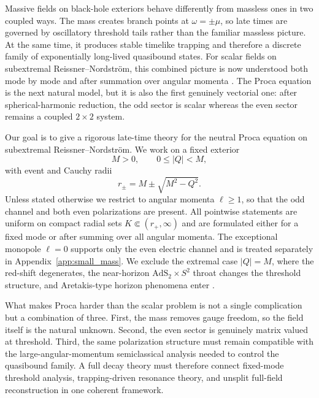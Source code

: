 \documentclass[12pt]{article}
\numberwithin{equation}{section}
\theoremstyle{plain}
\theoremstyle{definition}
\theoremstyle{remark}
\newcommand{\om}{\omega}
\newcommand{\abs}[1]{\left|#1\right|}
\begin{document}
Massive fields on black-hole exteriors behave differently from massless ones in two coupled ways.  The mass creates branch points at $\om=\pm\mu$, so late times are governed by oscillatory threshold tails rather than the familiar massless picture.  At the same time, it produces stable timelike trapping and therefore a discrete family of exponentially long-lived quasibound states.  For scalar fields on subextremal Reissner--Nordstr\"om, this combined picture is now understood both mode by mode and after summation over angular momenta \cite{PasqualottoShlapentokhRothmanVanDeMoortel2024,ShlapentokhRothmanVanDeMoortel2026}.  The Proca equation is the next natural model, but it is also the first genuinely vectorial one: after spherical-harmonic reduction, the odd sector is scalar whereas the even sector remains a coupled $2\times2$ system.

Our goal is to give a rigorous late-time theory for the neutral Proca equation on subextremal Reissner--Nordstr\"om.  We work on a fixed exterior
\begin{equation}\label{eq:intro_subextremal}
   M>0,
   \qquad
   0\le \abs{Q}<M,
\end{equation}
with event and Cauchy radii
\begin{equation}\label{eq:intro_rpm}
   r_\pm=M\pm\sqrt{M^2-Q^2}.
\end{equation}
Unless stated otherwise we restrict to angular momenta $\ell\ge1$, so that the odd channel and both even polarizations are present.  All pointwise statements are uniform on compact radial sets $K\Subset(r_+,\infty)$ and are formulated either for a fixed mode or after summing over all angular momenta.  The exceptional monopole $\ell=0$ supports only the even electric channel and is treated separately in Appendix~\ref{app:small_mass}.  We exclude the extremal case $\abs{Q}=M$, where the red-shift degenerates, the near-horizon $\mathrm{AdS}_2\times S^2$ throat changes the threshold structure, and Aretakis-type horizon phenomena enter \cite{LuciettiMurataReallTanahashi2013}.

What makes Proca harder than the scalar problem is not a single complication but a combination of three.  First, the mass removes gauge freedom, so the field itself is the natural unknown.  Second, the even sector is genuinely matrix valued at threshold.  Third, the same polarization structure must remain compatible with the large-angular-momentum semiclassical analysis needed to control the quasibound family.  A full decay theory must therefore connect fixed-mode threshold analysis, trapping-driven resonance theory, and unsplit full-field reconstruction in one coherent framework.
\end{document}
